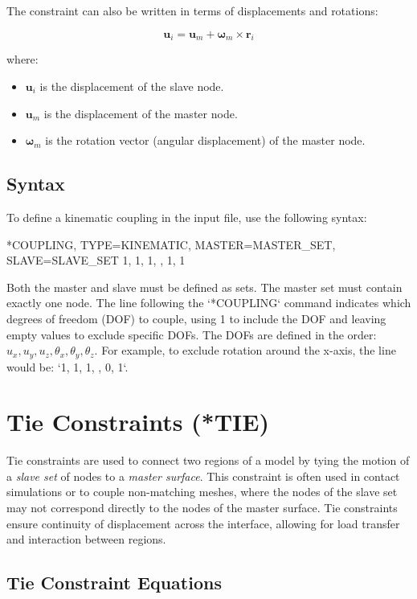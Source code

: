 The constraint can also be written in terms of displacements and rotations:

\[
\mathbf{u}_i = \mathbf{u}_m + \boldsymbol{\omega}_m \times \mathbf{r}_i
\]

where:
\begin{itemize}
    \item \( \mathbf{u}_i \) is the displacement of the slave node.
    \item \( \mathbf{u}_m \) is the displacement of the master node.
    \item \( \boldsymbol{\omega}_m \) is the rotation vector (angular displacement) of the master node.
\end{itemize}

\subsection{Syntax}

To define a kinematic coupling in the input file, use the following syntax:

\begin{codeBlock}
*COUPLING, TYPE=KINEMATIC, MASTER=MASTER_SET, SLAVE=SLAVE_SET
1, 1, 1, , 1, 1
\end{codeBlock}

Both the master and slave must be defined as sets. The master set must contain exactly one node. The line following the `*COUPLING` command indicates which degrees of freedom (DOF) to couple, using 1 to include the DOF and leaving empty values to exclude specific DOFs. The DOFs are defined in the order: \( u_x, u_y, u_z, \theta_x, \theta_y, \theta_z \).
For example, to exclude rotation around the x-axis, the line would be: `1, 1, 1, , 0, 1`.

\section{Tie Constraints (*TIE)}

Tie constraints are used to connect two regions of a model by tying the motion of a \textit{slave set} of nodes to a \textit{master surface}. This constraint is often used in contact simulations or to couple non-matching meshes, where the nodes of the slave set may not correspond directly to the nodes of the master surface. Tie constraints ensure continuity of displacement across the interface, allowing for load transfer and interaction between regions.

\subsection{Tie Constraint Equations}

